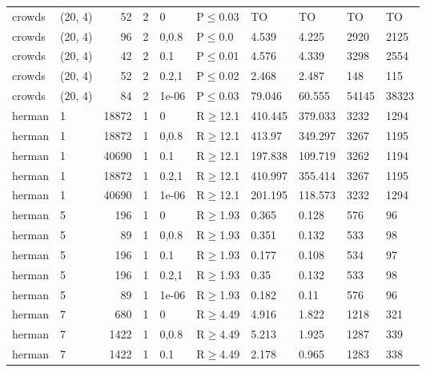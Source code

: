 \begin{longtable}{llrrllllll}
 crowds        & (20, 4)   &     	52 &    2 & 0     & P$\leq$0.03  & TO       & TO       & TO      & TO      \\
 crowds        & (20, 4)   &     	96 &    2 & 0,0.8 & P$\leq$0.0   & 4.539    & 4.225    & 2920    & 2125    \\
 crowds        & (20, 4)   &     	42 &    2 & 0.1   & P$\leq$0.01  & 4.576    & 4.339    & 3298    & 2554    \\
 crowds        & (20, 4)   &     	52 &    2 & 0.2,1 & P$\leq$0.02  & 2.468    & 2.487    & 148     & 115     \\
 crowds        & (20, 4)   &     	84 &    2 & 1e-06 & P$\leq$0.03  & 79.046   & 60.555   & 54145   & 38323   \\
 herman        & 1         &  	18872 &    1 & 0     & R$\geq$12.1  & 410.445  & 379.033  & 3232    & 1294    \\
 herman        & 1         &  	18872 &    1 & 0,0.8 & R$\geq$12.1  & 413.97   & 349.297  & 3267    & 1195    \\
 herman        & 1         &  	40690 &    1 & 0.1   & R$\geq$12.1  & 197.838  & 109.719  & 3262    & 1194    \\
 herman        & 1         &  	18872 &    1 & 0.2,1 & R$\geq$12.1  & 410.997  & 355.414  & 3267    & 1195    \\
 herman        & 1         &  	40690 &    1 & 1e-06 & R$\geq$12.1  & 201.195  & 118.573  & 3232    & 1294    \\
 herman        & 5         &    	196 &    1 & 0     & R$\geq$1.93  & 0.365    & 0.128    & 576     & 96      \\
 herman        & 5         &     	89 &    1 & 0,0.8 & R$\geq$1.93  & 0.351    & 0.132    & 533     & 98      \\
 herman        & 5         &    	196 &    1 & 0.1   & R$\geq$1.93  & 0.177    & 0.108    & 534     & 97      \\
 herman        & 5         &    	196 &    1 & 0.2,1 & R$\geq$1.93  & 0.35     & 0.132    & 533     & 98      \\
 herman        & 5         &     	89 &    1 & 1e-06 & R$\geq$1.93  & 0.182    & 0.11     & 576     & 96      \\
 herman        & 7         &    	680 &    1 & 0     & R$\geq$4.49  & 4.916    & 1.822    & 1218    & 321     \\
 herman        & 7         &   	1422 &    1 & 0,0.8 & R$\geq$4.49  & 5.213    & 1.925    & 1287    & 339     \\
 herman        & 7         &   	1422 &    1 & 0.1   & R$\geq$4.49  & 2.178    & 0.965    & 1283    & 338     \\

\end{longtable}
